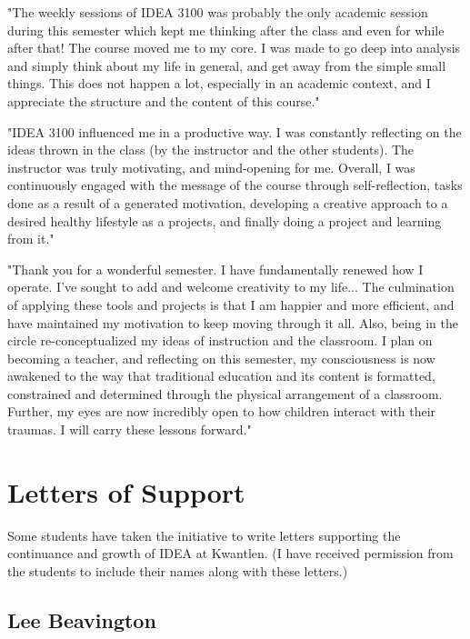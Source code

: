 \documentclass[letterpaper,10pt,headsepline]{scrreprt}
\begin{document}
"The weekly sessions of IDEA 3100 was probably the only academic session during this semester which kept me thinking after the class and even for while after that! The course moved me to my core. I was made to go deep into analysis and simply think about my life in general, and get away from the simple small things. This does not happen a lot, especially in an academic context, and I appreciate the structure and the content of this course."
\vspace{2em}

"IDEA 3100 influenced me in a productive way. I was constantly reflecting on the ideas thrown in the class (by the instructor and the other students). The instructor was truly motivating, and mind-opening for me. Overall, I was continuously engaged with the message of the course through self-reflection, tasks done as a result of a generated motivation, developing a creative approach to a desired healthy lifestyle as a projects, and finally doing a project and learning from it."
\vspace{2em}

"Thank you for a wonderful semester. I have fundamentally renewed how I operate. I’ve sought to add and welcome creativity to my life... The culmination of applying these tools and projects is that I am happier and more efficient, and have maintained my motivation to keep moving through it all. Also, being in the circle re-conceptualized my ideas of instruction and the classroom. I plan on becoming a teacher, and reflecting on this semester, my consciousness is now awakened to the way that traditional education and its content is formatted, constrained and determined through the physical arrangement of a classroom. Further, my eyes are now incredibly open to how children interact with their traumas. I will carry these lessons forward."
\vspace{2em}
\clearpage
\section{Letters of Support}

Some students have taken the initiative to write letters supporting the continuance and growth of IDEA at Kwantlen. (I have received permission from the students to include their names along with these letters.)

\subsection{Lee Beavington}
\end{document}
